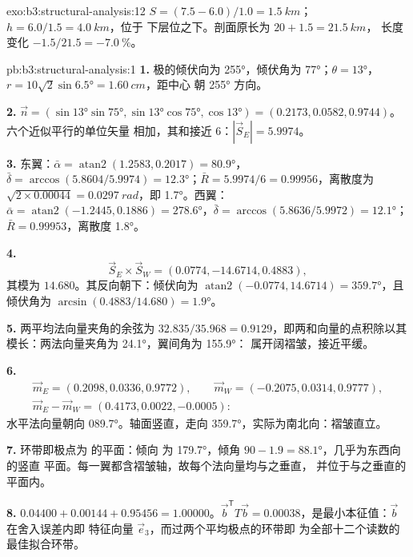 \begin{solution}{exo:b3:structural-analysis:12}
$S = (7.5 - 6.0)/1.0 = \qty{1.5}{km}$；$h = 6.0/1.5 = \qty{4.0}{km}$，位于
下层位之下。剖面原长为 $20 + 1.5 = \qty{21.5}{km}$，
长度变化 $-1.5/21.5 = \qty{-7.0}{\percent}$。
\end{solution}

\begin{solution}{pb:b3:structural-analysis:1}
\textbf{1.} 极的倾伏向为 \ang{255}，倾伏角为 \ang{77}；$\theta =
\ang{13}$，$r = 10\sqrt2\sin\ang{6.5} = \qty{1.60}{cm}$，距中心
朝 \ang{255} 方向。

\textbf{2.} $\vec n = (\sin\ang{13}\sin\ang{75}, \sin\ang{13}\cos\ang{75},
\cos\ang{13}) = (0.2173, 0.0582, 0.9744)$。六个近似平行的单位矢量
相加，其和接近 6：$|\vec S_E| = 5.9974$。

\textbf{3.} 东翼：$\bar\alpha = \operatorname{atan2}(1.2583, 0.2017) =
\ang{80.9}$，$\bar\delta = \arccos(5.8604/5.9974) = \ang{12.3}$；$\bar R
= 5.9974/6 = 0.99956$，离散度为 $\sqrt{2\times0.00044} =
\qty{0.0297}{rad}$，即 \ang{1.7}。西翼：$\bar\alpha =
\operatorname{atan2}(-1.2445, 0.1886) = \ang{278.6}$，$\bar\delta =
\arccos(5.8636/5.9972) = \ang{12.1}$；$\bar R = 0.99953$，离散度 \ang{1.8}。

\textbf{4.}
\[
  \vec S_E\times\vec S_W = (0.0774, -14.6714, 0.4883),
\]
其模为 $14.680$。其反向朝下：倾伏向为 $\operatorname{atan2}(-0.0774, 14.6714) = \ang{359.7}$，且
倾伏角为 $\arcsin(0.4883/14.680) = \ang{1.9}$。

\textbf{5.} 两平均法向量夹角的余弦为
$32.835/35.968 = 0.9129$，即两和向量的点积除以其
模长：两法向量夹角为 \ang{24.1}，翼间角为 \ang{155.9}：
属开阔褶皱，接近平缓。

\textbf{6.}
\begin{gather*}
  \vec m_E = (0.2098, 0.0336, 0.9772),\qquad \vec m_W = (-0.2075, 0.0314, 0.9777),\\
  \vec m_E - \vec m_W = (0.4173, 0.0022, -0.0005):
\end{gather*}
水平法向量朝向 \ang{089.7}。轴面竖直，走向
\ang{359.7}，实际为南北向：褶皱直立。

\textbf{7.} 环带即极点为 的平面：倾向
为 \ang{179.7}，倾角 $90 - 1.9 = \ang{88.1}$，几乎为东西向的竖直
平面。每一翼都含褶皱轴，故每个法向量均与之垂直，
并位于与之垂直的平面内。

\textbf{8.} $0.04400 + 0.00144 + 0.95456 = 1.00000$。$\vec b^{\mathsf T}T\vec
b = 0.00038$，是最小本征值：$\vec b$ 在舍入误差内即
特征向量 $\vec e_3$，而过两个平均极点的环带即
为全部十二个读数的最佳拟合环带。


\end{solution}

